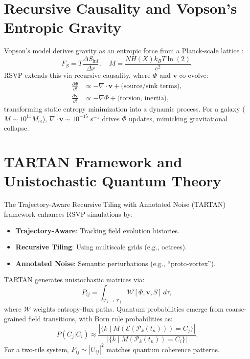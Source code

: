 \documentclass[11pt]{article}
\theoremstyle{plain}
\theoremstyle{definition}
\begin{document}
\section{Recursive Causality and Vopson’s Entropic Gravity}
\label{sec:recursive_causality}
Vopson’s model derives gravity as an entropic force from a Planck-scale lattice \citep{Vopson2022}:
\begin{equation}
F_S = T \frac{\Delta S_{\text{inf}}}{\Delta r}, \quad M = \frac{N H(X) k_B T \ln(2)}{c^2}.
\end{equation}
RSVP extends this via recursive causality, where $\Phi$ and $\bm{v}$ co-evolve:
\begin{align}
\frac{\partial \Phi}{\partial t} &\propto -\nabla \cdot \bm{v} + \text{(source/sink terms)}, \label{eq:phi_recursive} \\
\frac{\partial \bm{v}}{\partial t} &\propto -\nabla \Phi + \text{(torsion, inertia)}, \label{eq:v_recursive}
\end{align}
transforming static entropy minimization into a dynamic process. For a galaxy ($M \sim 10^{11} M_\odot$), $\nabla \cdot \bm{v} \sim 10^{-15}$ s$^{-1}$ drives $\Phi$ updates, mimicking gravitational collapse.

\section{TARTAN Framework and Unistochastic Quantum Theory}
\label{sec:tartan_unistochastic}
The Trajectory-Aware Recursive Tiling with Annotated Noise (TARTAN) framework enhances RSVP simulations by:
\begin{itemize}
    \item \textbf{Trajectory-Aware}: Tracking field evolution histories.
    \item \textbf{Recursive Tiling}: Using multiscale grids (e.g., octrees).
    \item \textbf{Annotated Noise}: Semantic perturbations (e.g., “proto-vortex”).
\end{itemize}
TARTAN generates unistochastic matrices \citep{Barandes2024} via:
\begin{equation}
P_{ij} = \int_{\mathcal{T}_i \to \mathcal{T}_j} \mathcal{W}[\Phi, \bm{v}, S] \, d\tau,
\end{equation}
where $\mathcal{W}$ weights entropy-flux paths. Quantum probabilities emerge from coarse-grained field transitions, with Born rule probabilities as:
\begin{equation}
P(C_j | C_i) \approx \frac{|\{ k \mid M(\mathcal{E}(\mathcal{P}_k(t_n))) = C_j \}|}{|\{ k \mid M(\mathcal{P}_k(t_n)) = C_i \}|}.
\end{equation}
For a two-tile system, $P_{ij} \sim |U_{ij}|^2$ matches quantum coherence patterns.
\end{document}
